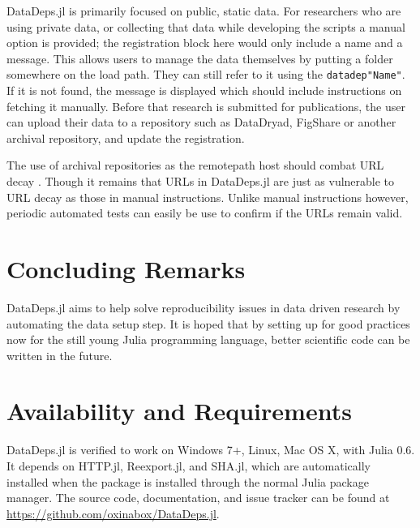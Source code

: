 \documentclass[twoside,11pt]{article}\usepackage{jmlr2e}
\newcommand{\datadep}[1]{\texttt{datadep"{}#1"{}}}
\begin{document}
DataDeps.jl is primarily focused on public, static data.
For researchers who are using private data, or collecting that data while developing the scripts a manual option is provided; the registration block here would only include a name and a message. This allows users to manage the data themselves by putting a folder somewhere on the load path. They can still refer to it using the \datadep{Name}. If it is not found, the message is displayed which should include instructions on fetching it manually.
Before that research is submitted for publications, the user can upload their data to a repository such as DataDryad, FigShare or another archival repository, and update the registration.

The use of archival repositories as the remotepath host should combat URL decay \citep{wren2008url}. Though it remains that URLs in DataDeps.jl are just as vulnerable to URL decay as those in manual instructions.
Unlike manual instructions however, periodic automated tests can easily be use to confirm if the URLs remain valid.

\section {Concluding Remarks}
DataDeps.jl aims to help solve reproducibility issues in data driven research by automating the data setup step.
It is hoped that by setting up for good practices now for the still young Julia programming language, better scientific code can be written in the future.



\section{Availability and Requirements}
DataDeps.jl is verified to work on  Windows 7+, Linux, Mac OS X, with Julia 0.6.
It depends on HTTP.jl, Reexport.jl, and SHA.jl, which are automatically installed when the package is installed through the normal Julia package manager.
The source code, documentation, and issue tracker can be found at \url{https://github.com/oxinabox/DataDeps.jl}.

\vskip 0.2in

\end{document}
